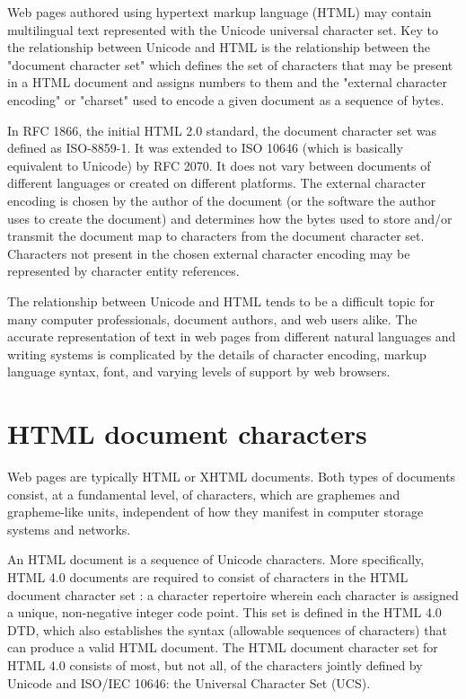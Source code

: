 Web pages authored using hypertext markup language (HTML) may contain multilingual text represented with the Unicode universal character set. Key to the relationship between Unicode and HTML is the relationship between the "document character set" which defines the set of characters that may be present in a HTML document and assigns numbers to them and the "external character encoding" or "charset" used to encode a given document as a sequence of bytes.

In RFC 1866, the initial HTML 2.0 standard, the document character set was defined as ISO-8859-1. It was extended to ISO 10646 (which is basically equivalent to Unicode) by RFC 2070. It does not vary between documents of different languages or created on different platforms. The external character encoding is chosen by the author of the document (or the software the author uses to create the document) and determines how the bytes used to store and/or transmit the document map to characters from the document character set. Characters not present in the chosen external character encoding may be represented by character entity references.

The relationship between Unicode\cite{unicode} and HTML tends to be a difficult topic for many computer professionals, document authors, and web users alike. The accurate representation of text in web pages from different natural languages and writing systems is complicated by the details of character encoding, markup language syntax, font, and varying levels of support by web browsers.



\section{HTML document characters}

Web pages are typically HTML or XHTML documents. Both types of documents consist, at a fundamental level, of characters, which are graphemes and grapheme-like units, independent of how they manifest in computer storage systems and networks.

An HTML document is a sequence of Unicode characters. More specifically, HTML 4.0 documents are required to consist of characters in the HTML document character set : a character repertoire wherein each character is assigned a unique, non-negative integer code point. This set is defined in the HTML 4.0 DTD, which also establishes the syntax (allowable sequences of characters) that can produce a valid HTML document. The HTML document character set for HTML 4.0 consists of most, but not all, of the characters jointly defined by Unicode and ISO/IEC 10646: the Universal Character Set (UCS).

